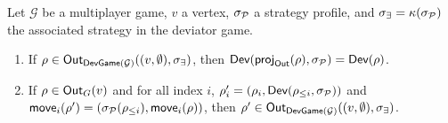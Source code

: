 \begin{lemma}\label{14-prop:correctness-deviator-game}
  Let $\mathcal{G}$ be a multiplayer game, $v$ a vertex, \(\sigma_{\mathcal{P}}\) a
  strategy profile, and \(\sigma_{\exists} = \kappa(\sigma_{\mathcal{P}})\) the
  associated strategy in the deviator game.

  \begin{enumerate}
    \def\labelenumi{\arabic{enumi}.}
  \item
    If \(\rho \in \textsf{Out}_{\textsf{DevGame}(\mathcal{G})}((v,\emptyset),\sigma_\exists)\), then
    \(\textsf{Dev}(\textsf{proj}_{\textsf{Out}}(\rho), \sigma_{\mathcal{P}} ) = \textsf{Dev}(\rho)\).
  \item
    If \(\rho \in \textsf{Out}_G(v)\) and for all index \(i\),
    \(\rho'_i = (\rho_i , \textsf{Dev}(\rho_{\le i} , \sigma_{\mathcal{P}}))\) and
    \(\textsf{move}_i(\rho') = (\sigma_{\mathcal{P}} (\rho_{\le i} ), \textsf{move}_i(\rho))\), then
    \(\rho' \in \textsf{Out}_{\textsf{DevGame}(\mathcal{G})}((v,\emptyset), \sigma_\exists)\).
  \end{enumerate}
\end{lemma}
